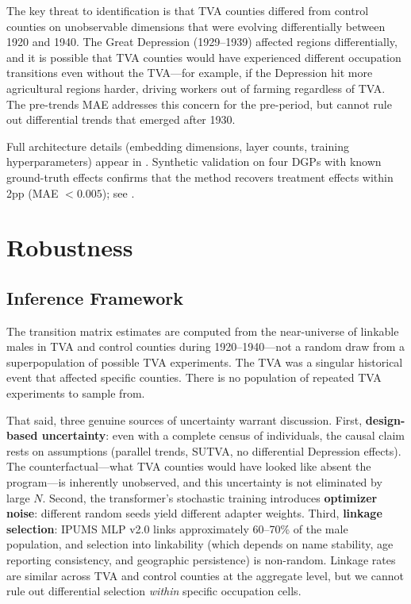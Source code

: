 \documentclass[12pt]{article}
\begin{document}
The key threat to identification is that TVA counties differed from control counties on unobservable dimensions that were evolving differentially between 1920 and 1940. The Great Depression (1929--1939) affected regions differentially, and it is possible that TVA counties would have experienced different occupation transitions even without the TVA---for example, if the Depression hit more agricultural regions harder, driving workers out of farming regardless of TVA. The pre-trends MAE addresses this concern for the pre-period, but cannot rule out differential trends that emerged after 1930.

Full architecture details (embedding dimensions, layer counts, training hyperparameters) appear in . Synthetic validation on four DGPs with known ground-truth effects confirms that the method recovers treatment effects within 2pp (MAE $< 0.005$); see .


\section{Robustness}
\label{sec:robustness}

\subsection{Inference Framework}

The transition matrix estimates are computed from the near-universe of linkable males in TVA and control counties during 1920--1940---not a random draw from a superpopulation of possible TVA experiments. The TVA was a singular historical event that affected specific counties. There is no population of repeated TVA experiments to sample from.

That said, three genuine sources of uncertainty warrant discussion. First, \textbf{design-based uncertainty}: even with a complete census of individuals, the causal claim rests on assumptions (parallel trends, SUTVA, no differential Depression effects). The counterfactual---what TVA counties would have looked like absent the program---is inherently unobserved, and this uncertainty is not eliminated by large $N$. Second, the transformer's stochastic training introduces \textbf{optimizer noise}: different random seeds yield different adapter weights. Third, \textbf{linkage selection}: IPUMS MLP v2.0 links approximately 60--70\% of the male population, and selection into linkability (which depends on name stability, age reporting consistency, and geographic persistence) is non-random. Linkage rates are similar across TVA and control counties at the aggregate level, but we cannot rule out differential selection \textit{within} specific occupation cells.
\end{document}
